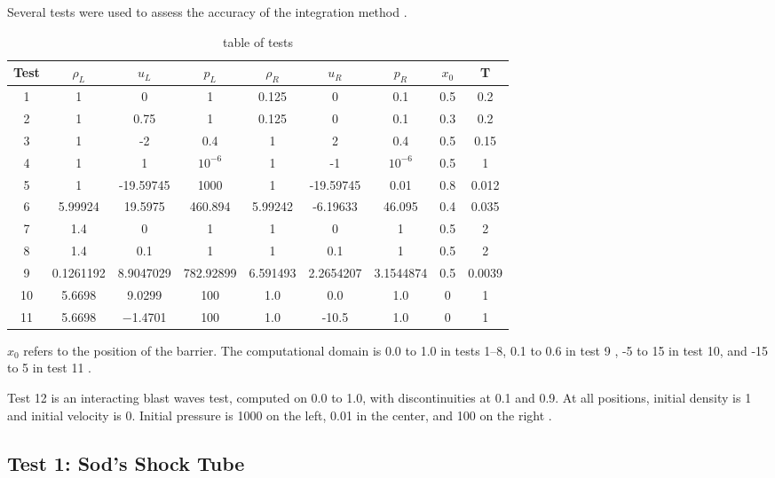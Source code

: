 \documentclass[10pt,preprint]{aastex}
\begin{document}
Several tests were used to assess the accuracy of the integration method \citep{LiskaWendroff2003}. 
\begin{table}[h!]
\begin{center}
\begin{tabular}{ |c|c c c|c c c|c c| }
 \hline
 Test & $\rho_L$ & $u_L$ & $p_L$ & $\rho_R$ & $u_R$ & $p_R$ & $x_0$ & T \\
 \hline
 1 & 1 & 0 & 1 & 0.125 & 0 & 0.1 & 0.5 & 0.2 \\
 2 & 1 & 0.75 & 1 & 0.125 & 0 & 0.1 & 0.3 & 0.2 \\
 3 & 1 & -2 & 0.4 & 1 & 2 & 0.4 & 0.5 & 0.15 \\
 4 & 1 & 1 & $10^{-6}$ & 1 & -1 & $10^{-6}$ & 0.5 & 1 \\
 5 & 1 & -19.59745 & 1000 & 1 & -19.59745 & 0.01 & 0.8 & 0.012 \\
 6 & 5.99924 & 19.5975 & 460.894 & 5.99242 & -6.19633 & 46.095 & 0.4 & 0.035 \\
 7 & 1.4 & 0 & 1 & 1 & 0 & 1 & 0.5 & 2 \\
 8 & 1.4 & 0.1 & 1 & 1 & 0.1 & 1 & 0.5 & 2 \\
 9 & 0.1261192 & 8.9047029 & 782.92899 & 6.591493 & 2.2654207 & 3.1544874 & 0.5 & 0.0039 \\
10 & 5.6698 & 9.0299 & 100 & 1.0 & 0.0 & 1.0 & 0 & 1 \\
11 & 5.6698 & −1.4701 & 100 & 1.0 & -10.5 & 1.0 & 0 & 1 \\
 \hline
\end{tabular}
  \caption{table of tests}
  \label{tab:testtable}
\end{center}
\end{table}
$x_0$ refers to the position of the barrier. The computational domain is 0.0 to 1.0 in tests 1--8, 0.1 to 0.6 in test 9 \citep{LiskaWendroff2003}, -5 to 15 in test 10, and -15 to 5 in test 11 \citep{Leveque2002}. 

Test 12 is an interacting blast waves test, computed on 0.0 to 1.0, with discontinuities at 0.1 and 0.9. At all positions, initial density is 1 and initial velocity is 0. Initial pressure is 1000 on the left, 0.01 in the center, and 100 on the right \citep{LiskaWendroff2003}.
\subsection{Test 1: Sod's Shock Tube} 
\end{document}
